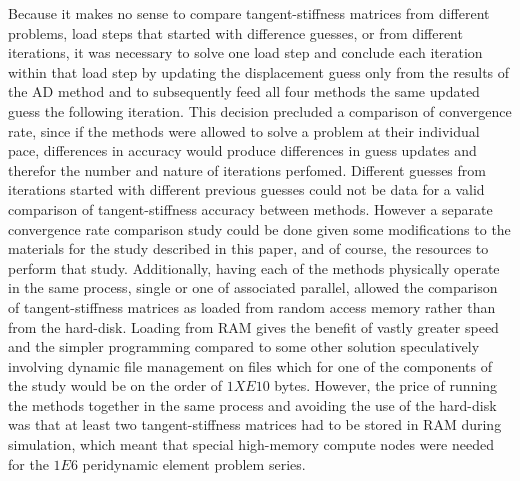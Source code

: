 \documentclass[preprint,12pt]{elsarticle}
\begin{document}
Because it makes no sense to compare tangent-stiffness matrices from different problems, load steps
that started with difference guesses, or from different iterations, it was necessary to solve one
load step and conclude each iteration within that load step by updating the displacement guess only
from the results of the AD method and to subsequently feed all four methods the same updated guess
the following iteration. This decision precluded a comparison of convergence rate, since if the
methods were allowed to solve a problem at their individual pace, differences in accuracy would
produce differences in guess updates and therefor the number and nature of iterations perfomed.
Different guesses from iterations started with different previous guesses could not be data for a
valid comparison of tangent-stiffness accuracy between methods.  However a separate convergence rate
comparison study could be done given some modifications to the materials for the study described in
this paper, and of course, the resources to perform that study.   Additionally, having each of the
methods physically operate in the same process, single or one of associated parallel, allowed the
comparison of tangent-stiffness matrices as loaded from random access memory rather than from the
hard-disk.  Loading from RAM gives the benefit of vastly greater speed and the simpler programming
compared to some other solution speculatively involving dynamic file management on files which for
one of the components of the study would be on the order of $1XE10$ bytes. However, the price of
running the methods together in the same process and avoiding the use of the hard-disk was that at
least two tangent-stiffness matrices had to be stored in RAM during simulation, which meant that
special high-memory compute nodes were needed for the $1E6$ peridynamic element problem series.
\end{document}
